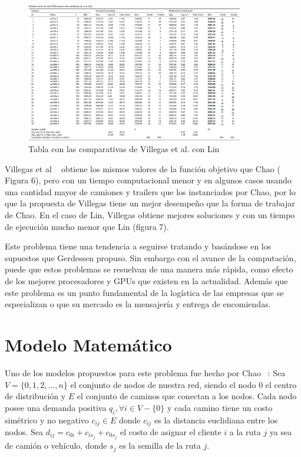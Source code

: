 \documentclass[letter, 10pt]{article}
\begin{document}
\begin{figure}[htbp!]
\label{Tabla5}
\centering
\includegraphics[width=0.85\textwidth]{Images/fig9.png}
\caption{Tabla con las comparativas de Villegas et al. con Lin ~\cite{Villegas}} 
\end{figure}

Villegas et al ~\cite{Villegas} obtiene los mismos valores de la función objetivo que Chao ( Figura 6), pero con un tiempo computacional menor y en algunos casos usando una cantidad mayor de camiones y trailers que los instanciados por Chao, por lo que la propuesta de Villegas tiene un mejor desempeño que la forma de trabajar de Chao. En el caso de Lin, Villegas obtiene mejores soluciones y con un tiempo  de ejecución mucho menor que Lin (figura 7).

Este problema tiene una tendencia a seguirse tratando y basándose en los supuestos que Gerdessen propuso. Sin embargo con el avance de la computación, puede que estos problemas se resuelvan de una manera más rápida, como efecto de los mejores procesadores  y GPUs que existen en la actualidad. Además que  este problema es un punto fundamental de la logística de las empresas que se especializan o que su mercado es la mensajería y entrega de encomiendas. 

\section{Modelo Matem\'atico}
\label{modelo}

Uno de los modelos propuestos para este problema fue hecho por Chao ~\cite{Chao}:
Sea $V = \{0,1,2,...,n\}$ el conjunto de nodos de nuestra red, siendo el nodo 0 el centro de distribución y $E$ el conjunto de caminos que conectan a los nodos. Cada nodo posee una demanda positiva $q_i, \forall i \in V - \{0\}$ y cada camino tiene un costo simétrico y no negativo $c_{ij} \in E$ donde $c_{ij}$ es la distancia euclidiana entre los nodos. Sea $d_{ij}= c_{0i}+c_{is_j}+c_{0s_j}$ el costo de asignar el cliente $i$ a la ruta $j$ ya sea de camión o vehículo, donde $s_j$ es la semilla de la ruta $j$.
\end{document}
